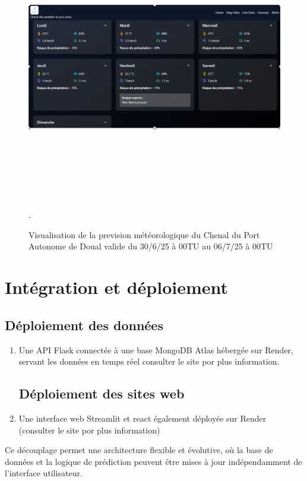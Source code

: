 \documentclass[a4paper,12pt,openany]{report}
\begin{document}
\begin{figure}[H]
	\begin{center}
				 \begin{minipage}{\textwidth}
				    \begin{center}
 \includegraphics[width=1\textwidth,height=4.6in]{images/prevision_7_jours.png}
				    \end{center}
				    \end{minipage}

			
			\caption{Visualisation de la prevision météorologique du Chenal du Port Autonome de Doual valide du 30/6/25 à 00TU au 06/7/25 à 00TU \label{Fig 
3.11}}.
		\end{center}
\end{figure}%


\section{Intégration et déploiement}

\subsection{Déploiement des données }
\begin{enumerate}
	\item Une API Flask connectée à une base MongoDB Atlas hébergée sur Render, servant les données en temps réel consulter le site por plus information. \\

%	

	
	\subsection{Déploiement des sites web }
	\item Une interface web Streamlit et react  également déployée sur Render (consulter le site por plus information)	
\end{enumerate}
Ce découplage permet une architecture flexible et évolutive, où la base de données et la logique de prédiction peuvent être mises à jour indépendamment de l’interface utilisateur.
\end{document}
